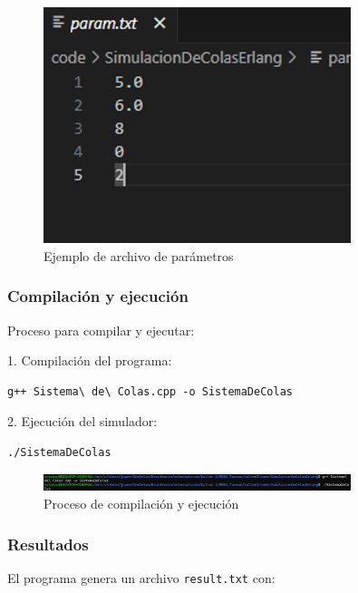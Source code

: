 \documentclass{article}
\begin{document}
\begin{figure}[H]
    \centering
    \includegraphics[width=0.8\textwidth]{images/manualUsuarioErlangBC_3.png}
    \caption{Ejemplo de archivo de parámetros}
    \label{fig:parametros}
\end{figure}

\subsubsection{Compilación y ejecución}
Proceso para compilar y ejecutar:

1. Compilación del programa:
\begin{verbatim}
g++ Sistema\ de\ Colas.cpp -o SistemaDeColas
\end{verbatim}

2. Ejecución del simulador:
\begin{verbatim}
./SistemaDeColas
\end{verbatim}

\begin{figure}[H]
    \centering
    \includegraphics[width=0.8\textwidth]{images/manualUsuarioErlangBC_4.png}
    \caption{Proceso de compilación y ejecución}
    \label{fig:compilacion}
\end{figure}

\subsubsection{Resultados}
El programa genera un archivo \texttt{result.txt} con:
\end{document}
